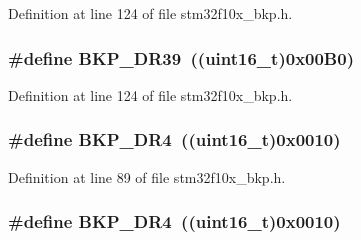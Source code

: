 Definition at line 124 of file stm32f10x\+\_\+bkp.\+h.

\subsubsection[{\texorpdfstring{B\+K\+P\+\_\+\+D\+R39}{BKP_DR39}}]{\setlength{\rightskip}{0pt plus 5cm}\#define B\+K\+P\+\_\+\+D\+R39~(({\bf uint16\+\_\+t})0x00\+B0)}\hypertarget{group___data___backup___register_ga1656f56588b474b1f48bb96380cdfd4a}{}\label{group___data___backup___register_ga1656f56588b474b1f48bb96380cdfd4a}


Definition at line 124 of file stm32f10x\+\_\+bkp.\+h.

\subsubsection[{\texorpdfstring{B\+K\+P\+\_\+\+D\+R4}{BKP_DR4}}]{\setlength{\rightskip}{0pt plus 5cm}\#define B\+K\+P\+\_\+\+D\+R4~(({\bf uint16\+\_\+t})0x0010)}\hypertarget{group___data___backup___register_gab327f2365ef58f3163f7fe8fa7b3c56e}{}\label{group___data___backup___register_gab327f2365ef58f3163f7fe8fa7b3c56e}


Definition at line 89 of file stm32f10x\+\_\+bkp.\+h.

\subsubsection[{\texorpdfstring{B\+K\+P\+\_\+\+D\+R4}{BKP_DR4}}]{\setlength{\rightskip}{0pt plus 5cm}\#define B\+K\+P\+\_\+\+D\+R4~(({\bf uint16\+\_\+t})0x0010)}\hypertarget{group___data___backup___register_gab327f2365ef58f3163f7fe8fa7b3c56e}{}\label{group___data___backup___register_gab327f2365ef58f3163f7fe8fa7b3c56e}


